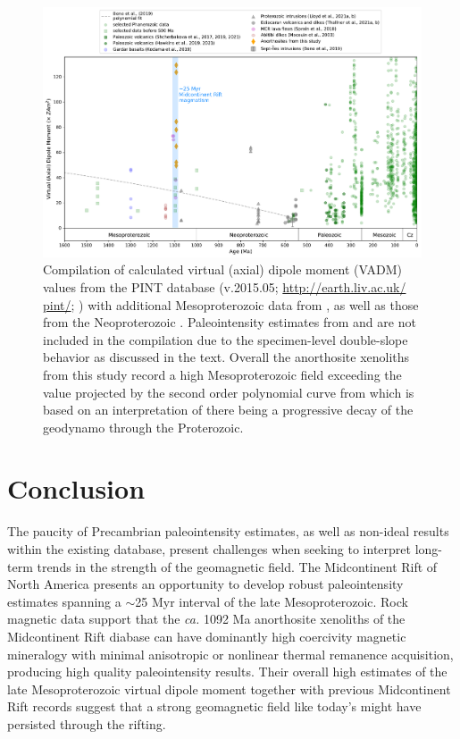 \documentclass[9pt,twocolumn,twoside,lineno]{pnas-new}
\begin{document}
\begin{figure}[h!]
\noindent\includegraphics[width=\textwidth]{PINT_compilation.pdf}
\centering
\caption{\footnotesize{Compilation of calculated virtual (axial) dipole moment (VADM) values from the PINT database (v.2015.05; \url{http://earth.liv.ac.uk/ pint/}; ) with additional Mesoproterozoic data from , as well as those from the Neoproterozoic \cite{Lloyd2021a, Lloyd2021b, Thallner2021a, Thallner2021b}. Paleointensity estimates from  and  are not included in the compilation due to the specimen-level double-slope behavior as discussed in the text. Overall the anorthosite xenoliths from this study record a high Mesoproterozoic field exceeding the value projected by the second order polynomial curve from  which is based on an interpretation of there being a progressive decay of the geodynamo through the Proterozoic.}}
\label{fig:PINT_compilation}
\end{figure}

\section*{Conclusion}

The paucity of Precambrian paleointensity estimates, as well as non-ideal results within the existing database, present challenges when seeking to interpret long-term trends in the strength of the geomagnetic field. The Midcontinent Rift of North America presents an opportunity to develop robust paleointensity estimates spanning a $\sim$25 Myr interval of the late Mesoproterozoic. Rock magnetic data support that the \textit{ca.} 1092 Ma anorthosite xenoliths of the Midcontinent Rift diabase can have dominantly high coercivity magnetic mineralogy with minimal anisotropic or nonlinear thermal remanence acquisition, producing high quality paleointensity results. Their overall high estimates of the late Mesoproterozoic virtual dipole moment together with previous Midcontinent Rift records suggest that a strong geomagnetic field like today's might have persisted through the rifting. 
\end{document}
